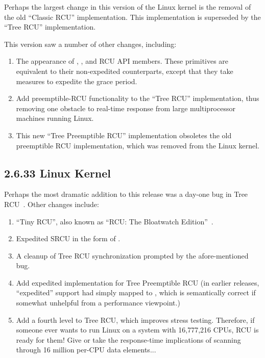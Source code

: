 Perhaps the largest change in this version of the Linux kernel
is the removal of the old ``Classic RCU'' implementation.
This implementation is superseded by the ``Tree RCU'' implementation.

This version saw a number of other changes, including:

\begin{enumerate}
\item	The appearance of ,
	, and
	 RCU API members.
	These primitives are equivalent to their non-expedited
	counterparts, except that they take measures to expedite the
	grace period.
\item	Add preemptible-RCU functionality to the ``Tree RCU''
	implementation, thus removing one obstacle to real-time
	response from large multiprocessor machines running Linux.
\item	This new ``Tree Preemptible RCU'' implementation obsoletes
	the old preemptible RCU implementation, which was removed
	from the Linux kernel.
\end{enumerate}

\subsection{2.6.33 Linux Kernel}

Perhaps the most dramatic addition to this release was
a day-one bug in Tree RCU~\cite{PaulEMcKenney2009HuntingHeisenbugs}.
Other changes include:

\begin{enumerate}
\item	``Tiny RCU'', also known as ``RCU: The Bloatwatch
	Edition''~\cite{PaulEMcKenney2009LWNBloatWatchRCU}.
\item	Expedited SRCU in the form of
	.
\item	A cleanup of Tree RCU synchronization prompted by the
	afore-mentioned bug.
\item	Add expedited implementation for Tree Preemptible RCU
	(in earlier releases, ``expedited'' support had simply
	mapped to , which is semantically
	correct if somewhat unhelpful from a performance viewpoint.)
\item	Add a fourth level to Tree RCU, which improves stress testing.
	Therefore, if someone ever wants to run Linux on a system with
	16,777,216 CPUs, RCU is ready for them!
	Give or take the response-time implications of scanning
	through 16 million per-CPU data elements...
\end{enumerate}

